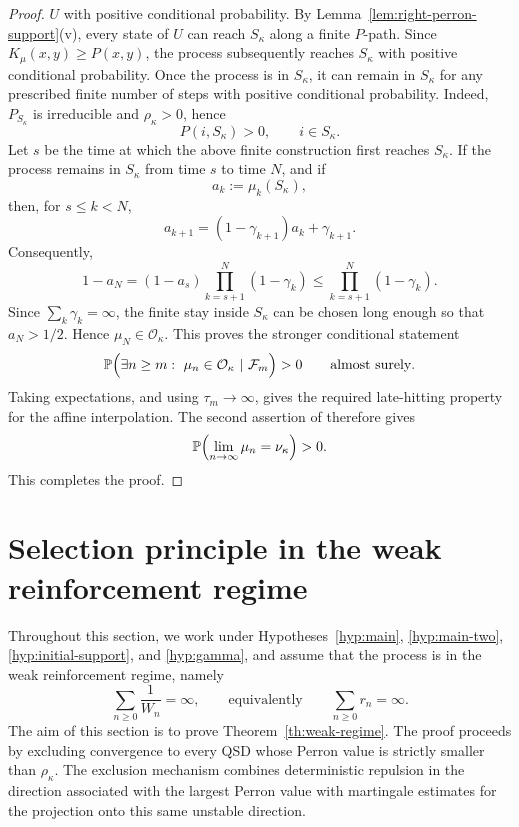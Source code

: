 \documentclass[10pt,letterpaper]{article}
\theoremstyle{compactplain}
\theoremstyle{compactdefinition}
\renewcommand{\Pr}{\mathbb P}
\newcommand{\1}{\mathds{1}}
\begin{document}
\begin{proof}
\(U\) with positive conditional probability. By
Lemma~\ref{lem:right-perron-support}\textup{(v)}, every state of \(U\) can
reach \(S_\kappa\) along a finite \(P\)-path. Since
\(K_\mu(x,y)\geq P(x,y)\), the process subsequently reaches \(S_\kappa\)
with positive conditional probability.
Once the process is in \(S_\kappa\), it can remain in \(S_\kappa\) for any
prescribed finite number of steps with positive conditional probability. Indeed,
\(P_{S_\kappa}\) is irreducible and \(\rho_\kappa>0\), hence
\[
P(i,S_\kappa)>0,
\qquad i\in S_\kappa.
\]
Let \(s\) be the time at which the above finite construction first reaches
\(S_\kappa\). If the process remains in \(S_\kappa\) from time \(s\) to time
\(N\), and if
\[
a_k:=\mu_k(S_\kappa),
\]
then, for \(s\leq k<N\),
\[
a_{k+1}=(1-\gamma_{k+1})a_k+\gamma_{k+1}.
\]
Consequently,
\[
1-a_N
=
(1-a_s)\prod_{k=s+1}^{N}(1-\gamma_k)
\leq
\prod_{k=s+1}^{N}(1-\gamma_k).
\]
Since \(\sum_k\gamma_k=\infty\), the finite stay inside \(S_\kappa\) can be
chosen long enough so that \(a_N>1/2\). Hence \(\mu_N\in\mathcal O_\kappa.\)
This proves the stronger conditional statement
\[
\mathbb P\Bigl(
\exists n\geq m:\ \mu_n\in\mathcal O_\kappa
\ \vert \ 
\mathcal F_m
\Bigr)>0
\qquad\text{almost surely}.
\]
Taking expectations, and using \(\tau_m\to\infty\), gives the required
late-hitting property for the affine interpolation. The second assertion of \cite[Theorem~7.3]{B99} therefore gives
\[
\Pr\Bigl(\lim_{n\to\infty}\mu_n=\nu_\kappa\Bigr)>0.
\]
This completes the proof.
\end{proof}


\section{Selection principle in the weak reinforcement regime}\label{sec:selection-weak-regime}

Throughout this section, we work under Hypotheses~\ref{hyp:main},
\ref{hyp:main-two}, \ref{hyp:initial-support}, and \ref{hyp:gamma}, and assume
that the process is in the weak reinforcement regime, namely
\[
\sum_{n\geq0}\frac1{W_n}=\infty,
\qquad\text{equivalently} \qquad
\sum_{n\geq0}r_n=\infty.
\]
The aim of this section is to prove Theorem~\ref{th:weak-regime}. The proof
proceeds by excluding convergence to every QSD whose Perron value is strictly
smaller than \(\rho_\kappa\). The exclusion mechanism combines deterministic
repulsion in the direction associated with the largest Perron value with
martingale estimates for the projection onto this same unstable direction.
\end{document}
